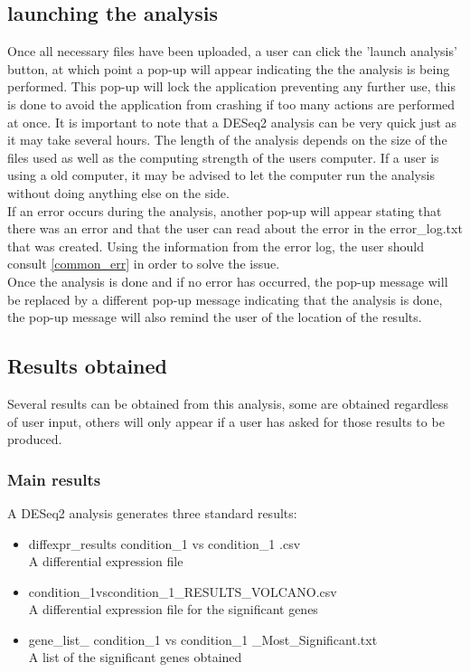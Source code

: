 \documentclass[11pt]{article}
\begin{document}
\subsection{launching the analysis}
Once all necessary files have been uploaded, a user can click the 'launch analysis' button, at which point a pop-up will appear indicating the the analysis is being performed. This pop-up will lock the application preventing any further use, this is done to avoid the application from crashing if too many actions are performed at once.
It is important to note that a DESeq2 analysis can be very quick just as it may take several hours. The length of the analysis depends on the size of the files used as well as the computing strength of the users computer. If a user is using a old computer, it may be advised to let the computer run the analysis without doing anything else on the side.\\
If an error occurs during the analysis, another pop-up will appear stating that there was an error and that the user can read about the error in the error\_log.txt that was created. Using the information from the error log, the user should consult \autoref{common_err} in order to solve the issue.\\
Once the analysis is done and if no error has occurred, the pop-up message will be replaced by a different pop-up message indicating that the analysis is done, the pop-up message will also remind the user of the location of the results.
\subsection{Results obtained}
Several results can be obtained from this analysis, some are obtained regardless of user input, others will only appear if a user has asked for those results to be produced.
\subsubsection{Main results}
A DESeq2 analysis generates three standard results:
\begin{itemize}
\item diffexpr\_results condition\_1 vs condition\_1 .csv\\
A differential expression file
\item condition\_1vscondition\_1\_RESULTS\_VOLCANO.csv\\
A differential expression file for the significant genes
\item gene\_list\_ condition\_1 vs condition\_1 \_Most\_Significant.txt\\
A list of the significant genes obtained
\end{itemize}
\end{document}
